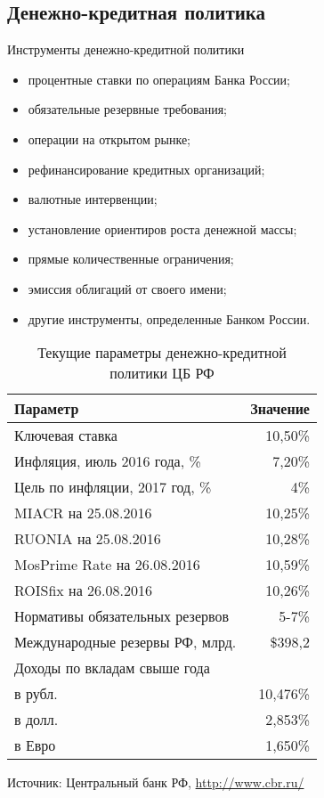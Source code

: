 \documentclass[_DKB_p1_Money.tex]{subfiles}
\begin{document}
\subsection{Денежно-кредитная политика}
\begin{frame}[ allowframebreaks]{Инструменты денежно-кредитной политики}
\begin{itemize}
\item
процентные ставки по операциям Банка России;
\item
обязательные резервные требования;
\item
операции на открытом рынке;
\item
рефинансирование кредитных организаций;

\pagebreak
\item
валютные интервенции;
\item
установление ориентиров роста денежной массы;
\item
прямые количественные ограничения;
\item
эмиссия облигаций от своего имени;
\item
другие инструменты, определенные Банком России.

\end{itemize}
\end{frame}

\begin{frame}[shrink=25]
\begin{table}[htbp]
\caption{Текущие параметры денежно-кредитной политики ЦБ РФ}
  \centering
\begin{tabularx}{\linewidth}[b]{@{}>{\raggedright\arraybackslash}Xr@{}}    \toprule
    Параметр & Значение \\
    \midrule
    Ключевая ставка & 10,50\% \\
    Инфляция, июль 2016 года, \%  & 7,20\% \\
    Цель по инфляции, 2017 год, \%  & 4\% \\
    MIACR на 25.08.2016  & 10,25\% \\
    RUONIA на 25.08.2016 & 10,28\% \\
    MosPrime  Rate на 26.08.2016 & 10,59\% \\
    ROISfix  на 26.08.2016 & 10,26\% \\
    Нормативы обязательных резервов & 5-7\% \\
    Международные резервы РФ, млрд. & \$398,2\\
    Доходы по вкладам свыше года & \\
    в рубл.  & 10,476\%\\
    в долл.  & 2,853\%\\
    в Евро  & 1,650\%\\
    \bottomrule
    \end{tabularx}%
  \label{tab:addlabel}%

\raggedright
Источник: Центральный банк РФ, \url{http://www.cbr.ru/}
\end{table}%
\end{frame}
\end{document}
